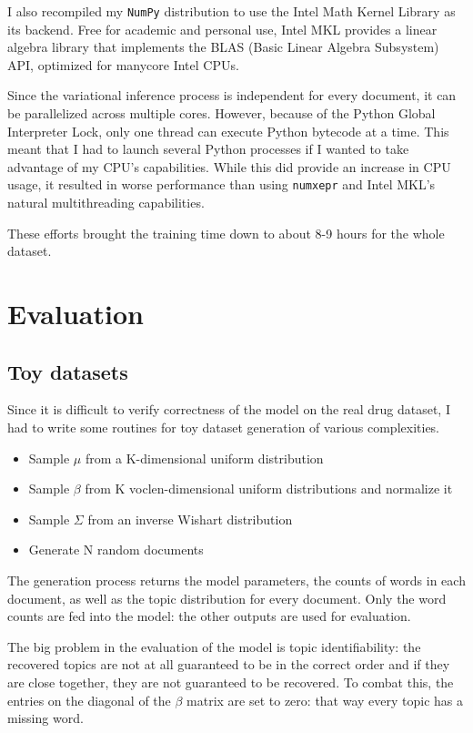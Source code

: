 \documentclass[12pt,a4paper,twoside,openright]{report}
\begin{document}
I also recompiled my \texttt{NumPy} distribution to use the Intel Math Kernel Library as its backend. Free for academic and personal use, Intel MKL provides a linear algebra library that implements the BLAS (Basic Linear Algebra Subsystem) API, optimized for manycore Intel CPUs.

Since the variational inference process is independent for every document, it can be parallelized across multiple cores. However, because of the Python Global Interpreter Lock, only one thread can execute Python bytecode at a time. This meant that I had to launch several Python processes if I wanted to take advantage of my CPU's capabilities. While this did provide an increase in CPU usage, it resulted in worse performance than using \texttt{numxepr} and Intel MKL's natural multithreading capabilities.

These efforts brought the training time down to about 8-9 hours for the whole dataset.

\chapter{Evaluation}

\section{Toy datasets}

Since it is difficult to verify correctness of the model on the real drug dataset, I had to write some routines for toy dataset generation of various complexities.

\begin{itemize}
\item Sample $\mu$ from a K-dimensional uniform distribution
\item Sample $\beta$ from K voclen-dimensional uniform distributions and normalize it
\item Sample $\Sigma$ from an inverse Wishart distribution
\item Generate N random documents
\end{itemize}

The generation process returns the model parameters, the counts of words in each document, as well as the topic distribution for every document. Only the word counts are fed into the model: the other outputs are used for evaluation.

The big problem in the evaluation of the model is topic identifiability: the recovered topics are not at all guaranteed to be in the correct order and if they are close together, they are not guaranteed to be recovered. To combat this, the entries on the diagonal of the $\beta$ matrix are set to zero: that way every topic has a missing word.
\end{document}

